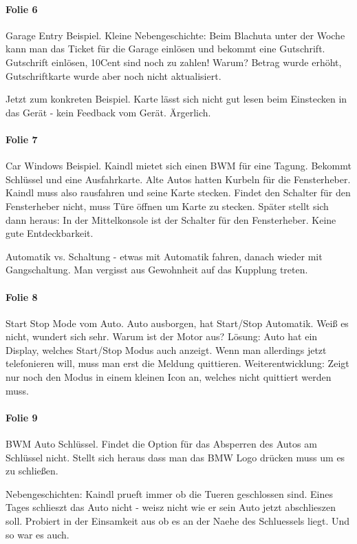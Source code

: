\paragraph{Folie 6}
Garage Entry Beispiel. 
Kleine Nebengeschichte: Beim Blachuta unter der Woche kann man das Ticket für die
Garage einlösen und bekommt eine Gutschrift. Gutschrift einlösen, 10Cent sind noch
zu zahlen! Warum? Betrag wurde erhöht, Gutschriftkarte wurde aber noch nicht aktualisiert.

Jetzt zum konkreten Beispiel.
Karte lässt sich nicht gut lesen beim Einstecken in das Gerät - kein Feedback vom
Gerät. Ärgerlich.

\paragraph{Folie 7}
Car Windows Beispiel. Kaindl mietet sich einen BWM für eine Tagung. Bekommt Schlüssel
und eine Ausfahrkarte. Alte Autos hatten Kurbeln für die Fensterheber. 
Kaindl muss also rausfahren und seine Karte stecken. Findet den Schalter für den
Fensterheber nicht, muss Türe öffnen um Karte zu stecken. 
Später stellt sich dann heraus: In der Mittelkonsole ist der Schalter für den 
Fensterheber. Keine gute Entdeckbarkeit. 

Automatik vs. Schaltung - etwas mit Automatik fahren, danach wieder mit Gangschaltung.
Man vergisst aus Gewohnheit auf das Kupplung treten. 

\paragraph{Folie 8}
Start Stop Mode vom Auto. Auto ausborgen, hat Start/Stop Automatik. Weiß es nicht,
wundert sich sehr. Warum ist der Motor aus?
Lösung: Auto hat ein Display, welches Start/Stop Modus auch anzeigt.
Wenn man allerdings jetzt telefonieren will, muss man erst die Meldung quittieren. 
Weiterentwicklung: Zeigt nur noch den Modus in einem kleinen Icon an, welches nicht
quittiert werden muss. 

\paragraph{Folie 9}
BWM Auto Schlüssel. 
Findet die Option für das Absperren des Autos am Schlüssel nicht. Stellt sich heraus
dass man das BMW Logo drücken muss um es zu schließen. 

Nebengeschichten:
Kaindl prueft immer ob die Tueren geschlossen sind. Eines Tages schlieszt das Auto
nicht - weisz nicht wie er sein Auto jetzt abschlieszen soll. 
Probiert in der Einsamkeit aus ob es an der Naehe des Schluessels liegt. Und so
war es auch. 

